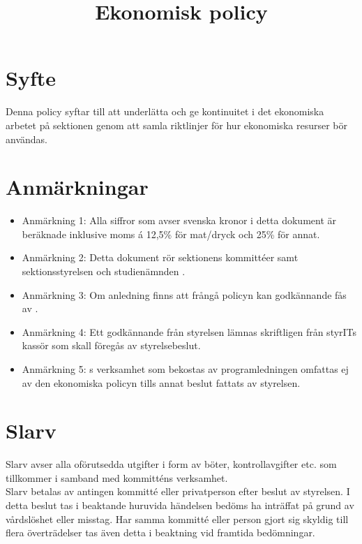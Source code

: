 \documentclass[11pt, includeaddress]{classes/cthit}
\begin{document}
\title{Ekonomisk policy}
\maketitle

\thispagestyle{empty}

\newpage

\makeheadfoot%

\setcounter{tocdepth}{2}
\setcounter{page}{1}
\tableofcontents

\newpage

\section{Syfte}
Denna policy syftar till att underlätta och ge kontinuitet i det ekonomiska arbetet på sektionen genom att samla riktlinjer för hur ekonomiska resurser bör användas.

\section{Anmärkningar}
\begin{itemize}
	\item Anmärkning 1: Alla siffror som avser svenska kronor i detta dokument är beräknade inklusive moms á 12,5\% för mat/dryck och 25\% för annat.
	\item Anmärkning 2: Detta dokument rör sektionens kommittéer samt sektionsstyrelsen \STYRIT{} och studienämnden \SNIT{}.
	\item Anmärkning 3: Om anledning finns att frångå policyn kan godkännande fås av \STYRIT{}.
	\item Anmärkning 4: Ett godkännande från styrelsen lämnas skriftligen från styrITs kassör som skall föregås av styrelsebeslut.
	\item Anmärkning 5: \SNIT{}s verksamhet som bekostas av programledningen omfattas ej av den ekonomiska policyn tills annat beslut fattats av styrelsen.
\end{itemize}

\section{Slarv}
Slarv avser alla oförutsedda utgifter i form av böter, kontrollavgifter etc. som tillkommer i samband med kommitténs verksamhet. \\
Slarv betalas av antingen kommitté eller privatperson efter beslut av styrelsen. I detta beslut tas i beaktande huruvida händelsen bedöms ha inträffat på grund av vårdslöshet eller misstag. Har samma kommitté eller person gjort sig skyldig till flera överträdelser tas även detta i beaktning vid framtida bedömningar.
\end{document}
